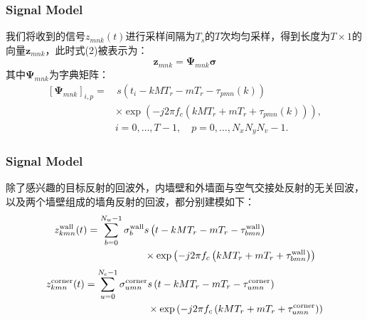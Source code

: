 \documentclass[cjk]{beamer}
\begin{document}
  \begin{frame}
	\frametitle{Signal Model}
	我们将收到的信号$z_{mnk}(t)$进行采样间隔为$T_s$的$T$次均匀采样，得到长度为$T\times 1$的向量${\boldsymbol z}_{mnk}$，此时式(2)被表示为：
	\begin{equation}
	  {\boldsymbol z}_{mnk}={\boldsymbol\Psi}_{mnk}{\boldsymbol\sigma}
	\end{equation}
	其中${\boldsymbol\Psi}_{mnk}$为字典矩阵：
	\begin{equation*}
	  \begin{split}
	  {[{\boldsymbol\Psi}_{mnk}]}_{i, p}=&\, s\left(t_{i}-kMT_{r}-mT_{r}-\tau_{pmn}(k)\right)\\
	  &\times\exp\left(-j2\pi f_{c}\left(kMT_{r}+mT_{r}+\tau_{pmn}(k)\right)\right),\\
	  &i=0,\ldots, T-1,\quad p=0,\ldots, N_{x}N_{y}N_{v}-1.
	  \end{split}
	\end{equation*}
  \end{frame}
  \begin{frame}
	\frametitle{Signal Model}
	除了感兴趣的目标反射的回波外，内墙壁和外墙面与空气交接处反射的无关回波，
	以及两个墙壁组成的墙角反射的回波，都分别建模如下：
	\begin{equation}
	  \begin{split}
	  z_{kmn}^{\rm wall}(t)=\sum_{b=0}^{N_{\rm w}-1}\sigma_{b}^{\rm wall}&s\left(t-kMT_{r}-mT_{r}-\tau_{bmn}^{\rm wall}\right)\\
	  &\times\exp\left(-j2\pi f_{c}\left(kMT_{r}+mT_{r}+\tau_{bmn}^{\rm wall}\right)\right)
	  \end{split}
	\end{equation}
	\begin{equation}
	  \begin{split}
z_{kmn}^{\rm corner}(t)=\sum_{u=0}^{N_{\rm c}-1}\sigma_{umn}^{\rm corner}&s\left(t-kMT_{r}-mT_{r}-\tau_{umn}^{\rm corner}\right)\\
  &\times\exp\left(-j2\pi f_{c}\left(kMT_{r}+mT_{r}+\tau_{umn}^{\rm corner}\right)\right)
	  \end{split}
	\end{equation}
  \end{frame}
\end{document}
